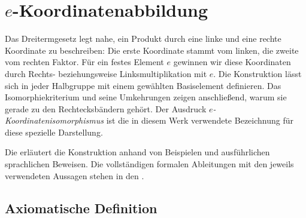 \documentclass[main.tex]{subfiles}
\begin{document}
\section{\texorpdfstring{\(e\)}{e}-Koordinatenabbildung}
\hypertarget{coordinates.main}{}

Das Dreitermgesetz legt nahe, ein Produkt durch eine linke und eine rechte
Koordinate zu beschreiben: Die erste Koordinate stammt vom linken, die
zweite vom rechten Faktor. Für ein festes Element \(e\) gewinnen wir diese
Koordinaten durch Rechts- beziehungsweise Linksmultiplikation mit \(e\).
Die Konstruktion lässt sich in jeder Halbgruppe mit einem gewählten
Basiselement definieren. Das Isomorphiekriterium und seine Umkehrungen
zeigen anschließend, warum sie gerade zu den Rechtecksbändern gehört.
Der Ausdruck \emph{\(e\)-Koordinatenisomorphismus} ist die in diesem Werk
verwendete Bezeichnung für diese spezielle Darstellung.

Die \CoordinatesReadingLink{}
erläutert die Konstruktion anhand von Beispielen und ausführlichen
sprachlichen Beweisen. Die vollständigen formalen Ableitungen mit den
jeweils verwendeten Aussagen stehen in den
\CoordinatesProofsLink{}.

\subsection{Axiomatische Definition}


\end{document}
